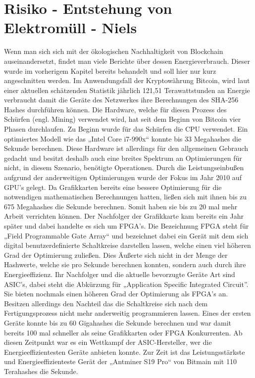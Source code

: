 \section{Risiko - Entstehung von Elektromüll - Niels}
Wenn man sich sich mit der ökologischen Nachhaltigkeit von Blockchain auseinandersetzt, findet man viele Berichte über dessen Energieverbrauch. Dieser wurde im vorherigem Kapitel bereits behandelt und soll hier nur kurz angeschnitten werden. Im Anwendungsfall der Kryptowährung Bitcoin, wird laut einer aktuellen schätzenden Statistik \cite{de_vries_bitcoin_nodate} jährlich 121,51 Terawattstunden an Energie verbraucht damit die Geräte des Netzwerkes ihre Berechnungen des SHA-256 Hashes durchführen können. Die Hardware, welche für diesen Prozess des Schürfen (engl. Mining) verwendet wird, hat seit dem Beginn von Bitcoin vier Phasen \cite{taylor_evolution_2017} durchlaufen.
\newline
Zu Beginn wurde für das Schürfen die CPU verwendet. Ein optimiertes Modell wie das „Intel Core i7-990x“ konnte bis 33 Megahashes die Sekunde berechnen. Diese Hardware ist allerdings für den allgemeinen Gebrauch gedacht und besitzt deshalb auch eine breites Spektrum an Optimierungen für nicht, in diesem Szenario, benötigte Operationen. Durch die Leistungseinbußen aufgrund der anderweitigen Optimierungen wurde der Fokus im Jahr 2010 auf GPU’s gelegt. Da Grafikkarten bereits eine bessere Optimierung für die notwendigen mathematischen Berechnungen hatten, ließen sich mit ihnen bis zu 675 Megahashes die Sekunde berechnen. Somit haben sie bis zu 20 mal mehr Arbeit verrichten können.
\newline
Der Nachfolger der Grafikkarte kam bereits ein Jahr später und dabei handelte es sich um FPGA’s. Die Bezeichnung FPGA steht für „Field Programmable Gate Array“ und bezeichnet dabei ein Gerät mit dem sich digital benutzerdefinierte Schaltkreise darstellen lassen, welche einen viel höheren Grad der Optimierung zuließen. Dies Äußerte sich nicht in der Menge der Hashwerte, welche sie pro Sekunde berechnen konnten, sondern auch durch ihre Energieeffizienz. Ihr Nachfolger und die aktuelle bevorzugte Geräte Art sind ASIC’s, dabei steht die Abkürzung für „Application Specific Integrated Circuit”. Sie bieten nochmals einen höheren Grad der Optimierung als FPGA’s an. Besitzen allerdings den Nachteil das die Schaltkreise sich nach dem Fertigungsprozess nicht mehr anderweitig programmieren lassen. Eines der ersten Geräte konnte bis zu 60 Gigahashes die Sekunde berechnen und war damit bereits 100 mal schneller als seine Grafikkarten oder FPGA Konkurrenten. Ab diesen Zeitpunkt  war es ein Wettkampf der ASIC-Hersteller, wer die Energieeffizientesten Geräte anbieten konnte. Zur Zeit ist das Leistungsstärkste und Energieeffizienteste Gerät der „Antminer S19 Pro“ \cite{michel_rauchs_cbeci_nodate} von Bitmain mit 110 Terahashes die Sekunde.
